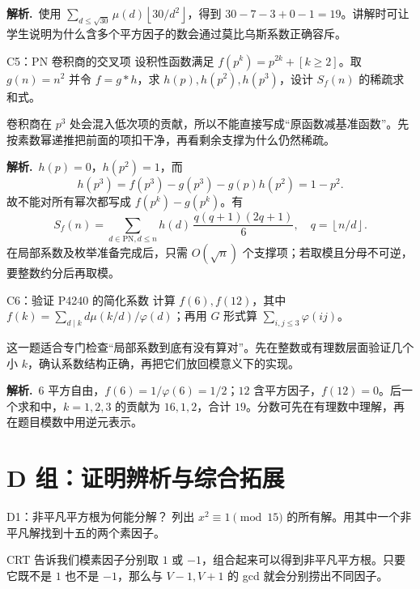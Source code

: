 \documentclass[UTF8,a4paper,11pt,twoside,openright,fontset=fandol]{ctexbook}
\theoremstyle{definition}
\newcommand{\floor}[1]{\left\lfloor #1\right\rfloor}
\newcommand{\sol}{\par\noindent\textbf{解析.}\ }
\begin{document}
\sol 使用 $\sum_{d\le\sqrt{30}}\mu(d)\floor{30/d^2}$，得到 $30-7-3+0-1=19$。讲解时可让学生说明为什么含多个平方因子的数会通过莫比乌斯系数正确容斥。


\begin{problem}{C5：PN 卷积商的交叉项}
设积性函数满足 $f(p^k)=p^{2k}+[k\ge2]$。取 $g(n)=n^2$ 并令 $f=g*h$，求 $h(p),h(p^2),h(p^3)$，设计 $S_f(n)$ 的稀疏求和式。
\end{problem}

\begin{pitfall}[讲解：先看这题到底在做什么]
卷积商在 $p^3$ 处会混入低次项的贡献，所以不能直接写成“原函数减基准函数”。先按素数幂递推把前面的项扣干净，再看剩余支撑为什么仍然稀疏。
\end{pitfall}

\sol $h(p)=0$，$h(p^2)=1$，而
\[
 h(p^3)=f(p^3)-g(p^3)-g(p)h(p^2)=1-p^2.
\]
故不能对所有幂次都写成 $f(p^k)-g(p^k)$。有
\[
 S_f(n)=\sum_{d\in\mathrm{PN},d\le n}h(d)\,
 \frac{q(q+1)(2q+1)}6,\quad q=\floor{n/d}.
\]
在局部系数及枚举准备完成后，只需 $O(\sqrt n)$ 个支撑项；若取模且分母不可逆，要整数约分后再取模。


\begin{problem}{C6：验证 P4240 的简化系数}
计算 $f(6),f(12)$，其中 $f(k)=\sum_{d\mid k}d\mu(k/d)/\varphi(d)$；再用 $G$ 形式算 $\sum_{i,j\le3}\varphi(ij)$。
\end{problem}

\begin{pitfall}[讲解：先看这题到底在做什么]
这一题适合专门检查“局部系数到底有没有算对”。先在整数或有理数层面验证几个小 $k$，确认系数结构正确，再把它们放回模意义下的实现。
\end{pitfall}

\sol $6$ 平方自由，$f(6)=1/\varphi(6)=1/2$；$12$ 含平方因子，$f(12)=0$。后一个求和中，$k=1,2,3$ 的贡献为 $16,1,2$，合计 $19$。分数可先在有理数中理解，再在题目模数中用逆元表示。


\section{D 组：证明辨析与综合拓展}
\begin{problem}{D1：非平凡平方根为何能分解？}
列出 $x^2\equiv1\pmod{15}$ 的所有解。用其中一个非平凡解找到十五的两个素因子。
\end{problem}

\begin{pitfall}[讲解：先看这题到底在做什么]
CRT 告诉我们模素因子分别取 $1$ 或 $-1$，组合起来可以得到非平凡平方根。只要它既不是 $1$ 也不是 $-1$，那么与 $V-1,V+1$ 的 gcd 就会分别捞出不同因子。
\end{pitfall}
\end{document}
